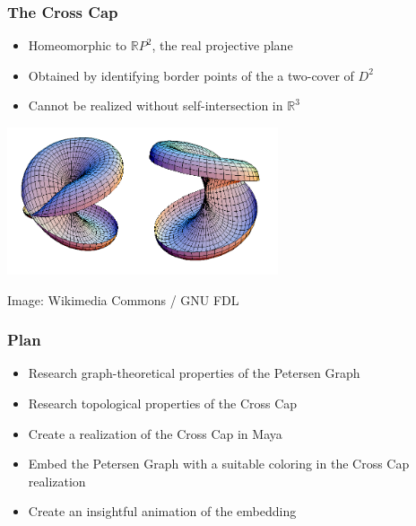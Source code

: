 \documentclass{beamer}
\begin{document}
\begin{frame}
 \frametitle{The Cross Cap}
  


\begin{itemize}
  \item Homeomorphic to $\mathbb{R}P^2$, the real projective plane
  \item Obtained by identifying border points of the a two-cover of $D^2$
  \item Cannot be realized without self-intersection in $\mathbb{R}^3$
\end{itemize}

\begin{center}
\includegraphics[width=0.6\textwidth]{CrossCapSlicedOpen.PNG}
\end{center}
\hfill\footnotesize{Image: Wikimedia Commons / GNU FDL}

  
 \end{frame}
\begin{frame}
 \frametitle{Plan}
  


\begin{itemize}
  \item Research graph-theoretical properties of the Petersen Graph
  \item Research topological properties of the Cross Cap
  \item Create a realization of the Cross Cap in Maya
  \item Embed the Petersen Graph with a suitable coloring in the Cross Cap realization
  \item Create an insightful animation of the embedding
\end{itemize}

  
 \end{frame}
\end{document}
